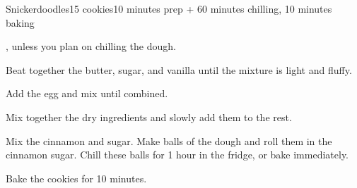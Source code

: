 \documentclass[../Cookbook.tex]{subfiles}
\begin{document}
\begin{recipe}{Snickerdoodles}{15 cookies}{10 minutes prep + 60 minutes chilling, 10 minutes baking}

, unless you plan on chilling the dough.

Beat together the butter, sugar, and vanilla until the mixture is light and fluffy.

Add the egg and mix until combined.

Mix together the dry ingredients and slowly add them to the rest.

Mix the cinnamon and sugar. Make balls of the dough and roll them in the cinnamon sugar. Chill these balls for 1 hour in the fridge, or bake immediately.

\newstep
Bake the cookies for 10 minutes.

\end{recipe}
\end{document}
